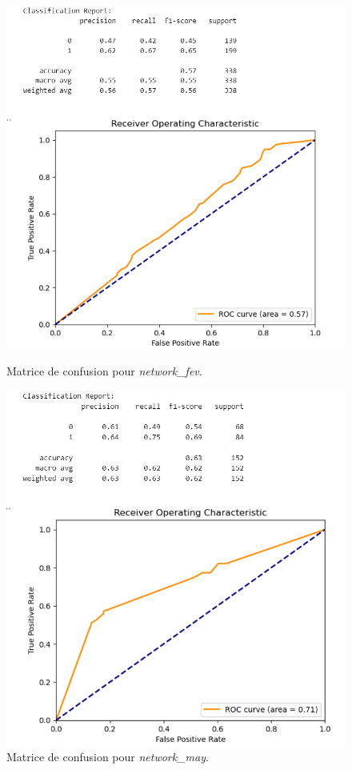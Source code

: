\begin{figure}[H]
    \centering
    \begin{minipage}{0.45\textwidth}
        \centering
        \includegraphics[width=\linewidth]{capture_modele_6.png}
        \caption{Matrice de confusion pour \textit{network\_fev}.}
    \end{minipage}
    \hfill
    \begin{minipage}{0.45\textwidth}
        \centering
        \includegraphics[width=\linewidth]{capture_modele_7.png}
        \caption{Matrice de confusion pour \textit{network\_may}.}
    \end{minipage}
\end{figure}


